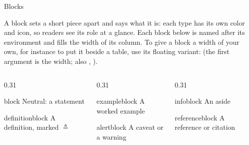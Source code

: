 
\begin{standardframe}{Blocks}
	{\small A block sets a short piece apart and says what it is: each type has
	its own color and icon, so readers see its role at a glance. Each block below
	is named after its environment and fills the width of its column. To give a
	block a width of your own, for instance to put it beside a table, use its floating
	variant:  (the first argument is the width; also , ).\par}
	\medskip
	\begin{columns}[t,onlytextwidth]
		\begin{column}{0.31\linewidth}
			\begin{block}{block}
				Neutral: a statement
			\end{block}
			\begin{definitionblock}{definitionblock}
				A definition, marked $\triangleq$
			\end{definitionblock}
		\end{column}
		\begin{column}{0.31\linewidth}
			\begin{exampleblock}{exampleblock}
				A worked example
			\end{exampleblock}
			\begin{alertblock}{alertblock}
				A caveat or a warning
			\end{alertblock}
		\end{column}
		\begin{column}{0.31\linewidth}
			\begin{infoblock}{infoblock}
				An aside
			\end{infoblock}
			\begin{referenceblock}{referenceblock}
				A reference or citation
			\end{referenceblock}
		\end{column}
	\end{columns}
\end{standardframe}
